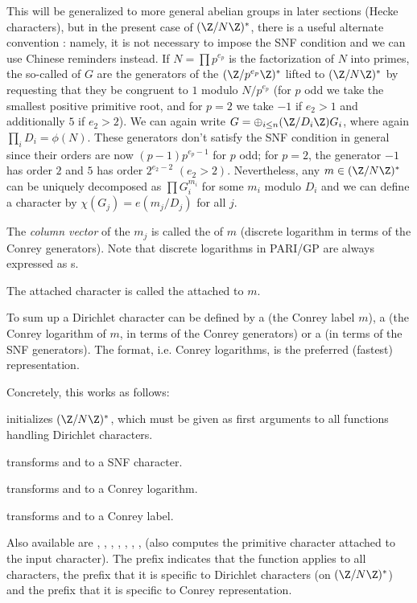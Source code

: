 This will be generalized to more general abelian groups in later sections
(Hecke characters), but in the present case of $(\Z/N\Z)^*$, there is a useful
alternate convention : namely, it is not necessary to impose the SNF
condition and we can use Chinese reminders instead. If $N = \prod p^{e_p}$ is
the factorization of $N$ into primes, the so-called 
of $G$ are the generators of the $(\Z/p^{e_p}\Z)^*$ lifted to $(\Z/N\Z)^*$ by
requesting that they be congruent to $1$ modulo $N/p^{e_p}$ (for $p$ odd we
take the smallest positive primitive root, and for $p = 2$ we take $-1$ if
$e_2 > 1$ and additionally $5$ if $e_2 > 2$). We can again write $G =
\oplus_{i\leq n} (\Z/D_i\Z) G_i$, where again $\prod_i D_i = \phi(N)$. These
generators don't satisfy the SNF condition in general since their orders are
now $(p-1)p^{e_p-1}$ for $p$ odd; for $p = 2$, the generator $-1$ has order
$2$ and $5$ has order $2^{e_2-2}$ $(e_2 > 2)$. Nevertheless, any $m\in
(\Z/N\Z)^*$ can be uniquely decomposed as $\prod G_i^{m_i}$ for some $m_i$
modulo $D_i$ and we can define a character by $\chi(G_j) = e(m_j / D_j)$ for
all $j$.

\item The \emph{column vector} of the $m_j$ is called the
 of $m$ (discrete logarithm in terms of the Conrey
generators). Note that discrete logarithms in PARI/GP are always expressed as
s.

\item The attached character is called the 
attached to $m$.

To sum up a Dirichlet character can be defined by a  (the Conrey
label $m$), a  (the Conrey logarithm of $m$, in terms of the Conrey
generators) or a  (in  terms of the SNF generators). The 
format, i.e. Conrey logarithms, is the preferred (fastest) representation.

Concretely, this works as follows:

 initializes $(\Z/N\Z)^*$, which must be given as
first arguments to all functions handling Dirichlet characters.

 transforms  and  to a SNF character.

 transforms  and  to a Conrey logarithm.

 transforms  and  to a Conrey label.

Also available are ,  , ,
, , , ,
 (also computes the primitive character attached to
the input character). The prefix  indicates that the function
applies to all characters, the prefix  that it is specific to
Dirichlet characters (on $(\Z/N\Z)^*$) and the prefix  that it
is specific to Conrey representation.


